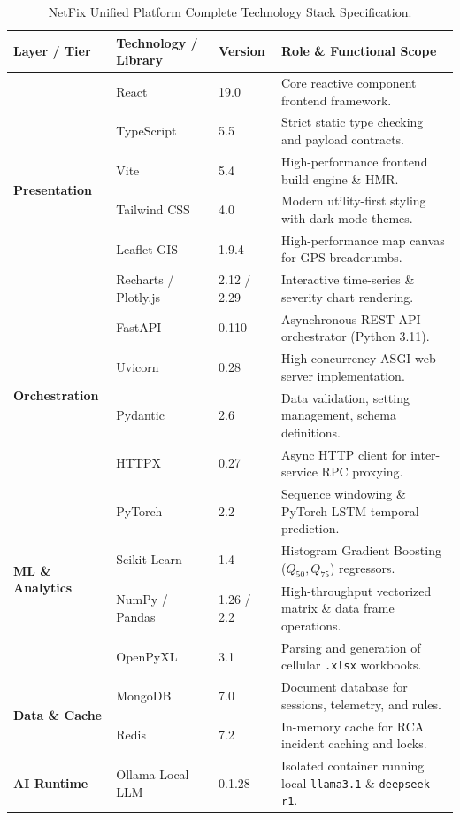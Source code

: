 \documentclass[12pt,a4paper]{report}
\begin{document}
\begin{table}[htbp]
\centering
\caption{NetFix Unified Platform Complete Technology Stack Specification.}
\label{tab:tech_stack}
\small
\begin{tabular}{lllp{7cm}}
\toprule
\textbf{Layer / Tier} & \textbf{Technology / Library} & \textbf{Version} & \textbf{Role \& Functional Scope} \\
\midrule
\multirow{6}{*}{\textbf{Presentation}} 
 & React & 19.0 & Core reactive component frontend framework. \\
 & TypeScript & 5.5 & Strict static type checking and payload contracts. \\
 & Vite & 5.4 & High-performance frontend build engine \& HMR. \\
 & Tailwind CSS & 4.0 & Modern utility-first styling with dark mode themes. \\
 & Leaflet GIS & 1.9.4 & High-performance map canvas for GPS breadcrumbs. \\
 & Recharts / Plotly.js & 2.12 / 2.29 & Interactive time-series \& severity chart rendering. \\
\midrule
\multirow{4}{*}{\textbf{Orchestration}} 
 & FastAPI & 0.110 & Asynchronous REST API orchestrator (Python 3.11). \\
 & Uvicorn & 0.28 & High-concurrency ASGI web server implementation. \\
 & Pydantic & 2.6 & Data validation, setting management, schema definitions. \\
 & HTTPX & 0.27 & Async HTTP client for inter-service RPC proxying. \\
\midrule
\multirow{4}{*}{\textbf{ML \& Analytics}} 
 & PyTorch & 2.2 & Sequence windowing \& PyTorch LSTM temporal prediction. \\
 & Scikit-Learn & 1.4 & Histogram Gradient Boosting ($Q_{50}, Q_{75}$) regressors. \\
 & NumPy / Pandas & 1.26 / 2.2 & High-throughput vectorized matrix \& data frame operations. \\
 & OpenPyXL & 3.1 & Parsing and generation of cellular \texttt{.xlsx} workbooks. \\
\midrule
\multirow{2}{*}{\textbf{Data \& Cache}} 
 & MongoDB & 7.0 & Document database for sessions, telemetry, and rules. \\
 & Redis & 7.2 & In-memory cache for RCA incident caching and locks. \\
\midrule
\textbf{AI Runtime} 
 & Ollama Local LLM & 0.1.28 & Isolated container running local \texttt{llama3.1} \& \texttt{deepseek-r1}. \\
\bottomrule
\end{tabular}
\end{table}
\end{document}

